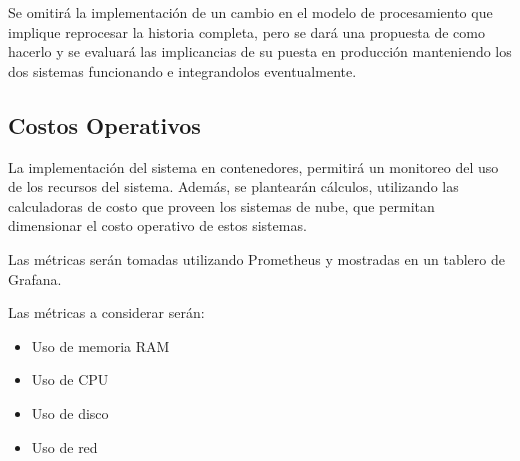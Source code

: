 Se omitirá la implementación de un cambio en el modelo de procesamiento que implique reprocesar la historia completa, 
pero se dará una propuesta de como hacerlo y se evaluará las implicancias de su puesta en producción manteniendo los dos sistemas funcionando e integrandolos eventualmente.

\newpage

\subsection{Costos Operativos}

La implementación del sistema en contenedores, permitirá un monitoreo del uso de los recursos del sistema.
Además, se plantearán cálculos, utilizando las calculadoras de costo que proveen los sistemas de nube, que permitan dimensionar el costo operativo de estos sistemas.\newline

Las métricas serán tomadas utilizando Prometheus y mostradas en un tablero de Grafana.\newline

Las métricas a considerar serán:
\begin{itemize}
    \item Uso de memoria RAM
    \item Uso de CPU
    \item Uso de disco
    \item Uso de red
\end{itemize}

\newpage